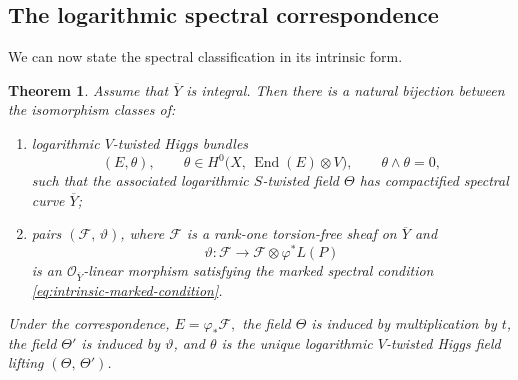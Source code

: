 \documentclass[a4paper,12pt]{amsart}
\numberwithin{equation}{section}
\newtheorem{theorem}{Theorem}[section]
\theoremstyle{definition}
\newcommand{\OO}{\mathcal{O}}
\newcommand{\cF}{\mathcal{F}}
\newcommand{\End}{\operatorname{End}}
\begin{document}
\subsection{The logarithmic spectral correspondence}

We can now state the spectral classification in its intrinsic form.

\begin{theorem}\label{thm:B-marked}
Assume that \(\overline{Y}\) is integral.  Then there is a natural bijection between the isomorphism classes of:
\begin{enumerate}
\item[(I)] logarithmic \(V\)-twisted Higgs bundles
\[
(E,\theta),
\qquad
\theta\in H^0\bigl(X,\, \End(E)\otimes V\bigr),
\qquad
\theta\wedge\theta=0,
\]
such that the associated logarithmic \(S\)-twisted field \(\Theta\) has compactified spectral curve \(\overline{Y}\);

\item[(II)] pairs \((\cF,\,\vartheta)\), where \(\cF\) is a rank-one torsion-free sheaf on \(\overline{Y}\) and
\[
\vartheta:\cF\longrightarrow \cF\otimes \varphi^*L(P)
\]
is an \(\OO_{\overline{Y}}\)-linear morphism satisfying the marked spectral condition \eqref{eq:intrinsic-marked-condition}.
\end{enumerate}
Under the correspondence,
\(
E=\varphi_*\cF,
\)
the field \(\Theta\) is induced by multiplication by \(t\), the field \(\Theta'\) is induced by \(\vartheta\), and \(\theta\) is the unique logarithmic \(V\)-twisted Higgs field lifting \((\Theta,\,\Theta')\).
\end{theorem}
\end{document}
